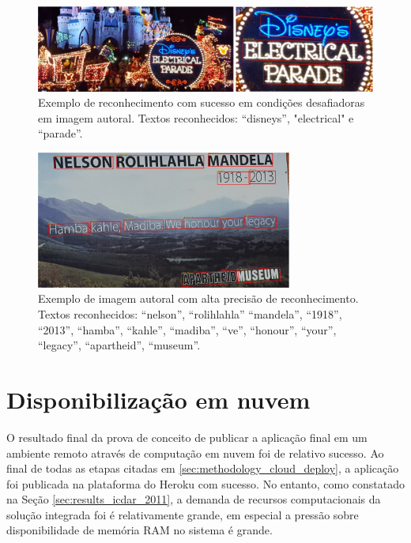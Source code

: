 \begin{figure}
    \centering
    \includegraphics[width=\textwidth]{figs/resultados-autoral-04.png}
    \caption{Exemplo de reconhecimento com sucesso em condições desafiadoras em imagem autoral. Textos reconhecidos: “disneys”, "electrical" e “parade”.}
    \label{fig:results_own_images_04}
\end{figure}

\begin{figure}
    \centering
    \includegraphics[width=0.75\textwidth]{figs/resultados-autoral-05.png}
    \caption{Exemplo de imagem autoral com alta precisão de reconhecimento. Textos reconhecidos: “nelson”, “rolihlahla” “mandela”, “1918”, “2013”, “hamba”, “kahle”, “madiba”, “ve”, “honour”, “your”, “legacy”, “apartheid”, “museum”.}
    \label{fig:results_own_images_05}
\end{figure}


\section{Disponibilização em nuvem}
O resultado final da prova de conceito de publicar a aplicação final em um ambiente remoto através de computação em nuvem foi de relativo sucesso. Ao final de todas as etapas citadas em \ref{sec:methodology_cloud_deploy}, a aplicação foi publicada na plataforma do Heroku com sucesso. No entanto, como constatado na Seção \ref{sec:results_icdar_2011}, a demanda de recursos computacionais da solução integrada foi é relativamente grande, em especial a pressão sobre disponibilidade de memória RAM no sistema é grande.

